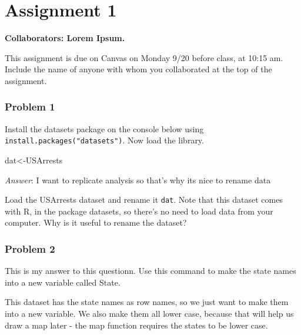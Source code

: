 \documentclass[
]{article}
\newenvironment{Shaded}{\begin{snugshade}}{\end{snugshade}}
\newcommand{\FunctionTok}[1]{\textcolor[rgb]{0.00,0.00,0.00}{#1}}
\newcommand{\NormalTok}[1]{#1}
\newcommand{\OtherTok}[1]{\textcolor[rgb]{0.56,0.35,0.01}{#1}}
\newcommand{\SpecialCharTok}[1]{\textcolor[rgb]{0.00,0.00,0.00}{#1}}
\begin{document}
\hypertarget{assignment-1}{%
\section{Assignment 1}\label{assignment-1}}

\textbf{Collaborators: Lorem Ipsum. }

This assignment is due on Canvas on Monday 9/20 before class, at 10:15
am. Include the name of anyone with whom you collaborated at the top of
the assignment.

\hypertarget{problem-1}{%
\subsubsection{Problem 1}\label{problem-1}}

Install the datasets package on the console below using
\texttt{install.packages("datasets")}. Now load the library.

\begin{Shaded}
\begin{Highlighting}[]
\NormalTok{dat}\OtherTok{\textless{}{-}}\NormalTok{USArrests}
\end{Highlighting}
\end{Shaded}

\emph{Answer}: I want to replicate analysis so that's why its nice to
rename data

Load the USArrests dataset and rename it \texttt{dat}. Note that this
dataset comes with R, in the package datasets, so there's no need to
load data from your computer. Why is it useful to rename the dataset?

\hypertarget{problem-2}{%
\subsubsection{Problem 2}\label{problem-2}}

This is my answer to this questionn. Use this command to make the state
names into a new variable called State.

\begin{Shaded}
\end{Shaded}

This dataset has the state names as row names, so we just want to make
them into a new variable. We also make them all lower case, because that
will help us draw a map later - the map function requires the states to
be lower case.
\end{document}
